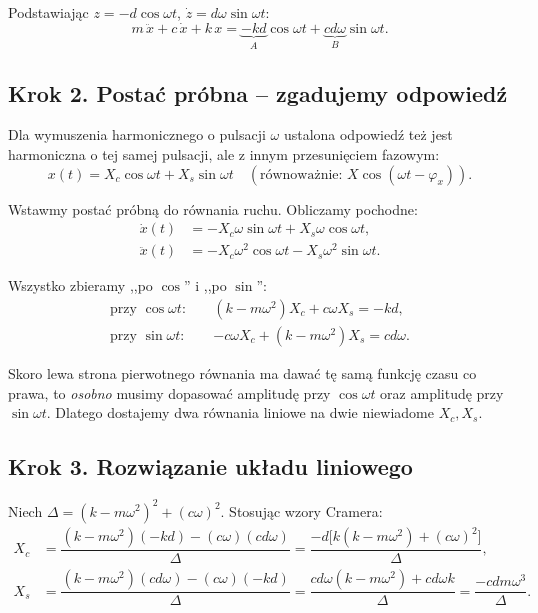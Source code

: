 \documentclass[11pt,a4paper]{article}
\theoremstyle{plainpol}
\begin{document}
Podstawiając $z = -d\cos\omega t$, $\dot{z} = d\omega\sin\omega t$:
\begin{equation}
  m\,\ddot{x} + c\,\dot{x} + k\,x = \underbrace{-kd}_{A}\cos\omega t + \underbrace{cd\omega}_{B}\sin\omega t.
\end{equation}

\subsection{Krok 2. Postać próbna -- zgadujemy odpowiedź}

Dla wymuszenia harmonicznego o pulsacji $\omega$ ustalona odpowiedź też
jest harmoniczna o tej samej pulsacji, ale z innym przesunięciem
fazowym:
\begin{equation}
  x(t) = X_c\cos\omega t + X_s\sin\omega t \quad (\text{równoważnie: } X\cos(\omega t - \varphi_x)).
\end{equation}

Wstawmy postać próbną do równania ruchu. Obliczamy pochodne:
\begin{align}
  \dot{x}(t) &= -X_c\omega\sin\omega t + X_s\omega\cos\omega t,\\
  \ddot{x}(t) &= -X_c\omega^2\cos\omega t - X_s\omega^2\sin\omega t.
\end{align}

Wszystko zbieramy ,,po $\cos$'' i ,,po $\sin$'':
\begin{align}
  \text{przy } \cos\omega t:\quad & (k - m\omega^2)X_c + c\omega X_s = -kd, \\
  \text{przy } \sin\omega t:\quad & -c\omega X_c + (k - m\omega^2)X_s = cd\omega.
\end{align}

\begin{intuicja}
Skoro lewa strona pierwotnego równania ma dawać tę samą funkcję czasu
co prawa, to \emph{osobno} musimy dopasować amplitudę przy $\cos\omega t$
oraz amplitudę przy $\sin\omega t$. Dlatego dostajemy dwa równania
liniowe na dwie niewiadome $X_c, X_s$.
\end{intuicja}

\subsection{Krok 3. Rozwiązanie układu liniowego}

Niech $\Delta = (k - m\omega^2)^2 + (c\omega)^2$. Stosując wzory Cramera:
\begin{align}
  X_c &= \dfrac{(k - m\omega^2)(-kd) - (c\omega)(cd\omega)}{\Delta}
       = \dfrac{-d\bigl[k(k - m\omega^2) + (c\omega)^2\bigr]}{\Delta},\\
  X_s &= \dfrac{(k - m\omega^2)(cd\omega) - (c\omega)(-kd)}{\Delta}
       = \dfrac{cd\omega(k - m\omega^2) + cd\omega k}{\Delta}
       = \dfrac{-cd m\omega^3}{\Delta}.
\end{align}
\end{document}
